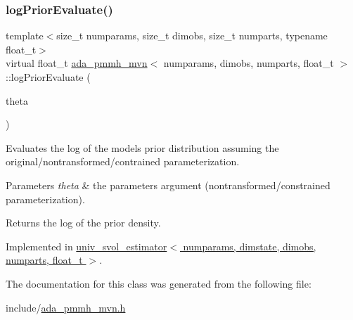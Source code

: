 \mbox{\label{classada__pmmh__mvn_af946eae70a63045515ed7830c35106dc}} 
\subsubsection{\texorpdfstring{log\+Prior\+Evaluate()}{logPriorEvaluate()}}
{\footnotesize\ttfamily template$<$size\+\_\+t numparams, size\+\_\+t dimobs, size\+\_\+t numparts, typename float\+\_\+t$>$ \\
virtual float\+\_\+t \hyperlink{classada__pmmh__mvn}{ada\+\_\+pmmh\+\_\+mvn}$<$ numparams, dimobs, numparts, float\+\_\+t $>$\+::log\+Prior\+Evaluate (\begin{DoxyParamCaption}\item[{const \hyperlink{classparamPack}{param\+Pack}$<$ float\+\_\+t $>$ \&}]{theta }\end{DoxyParamCaption})\hspace{0.3cm}{\ttfamily [pure virtual]}}



Evaluates the log of the model\textquotesingle{}s prior distribution assuming the original/nontransformed/contrained parameterization. 


\begin{DoxyParams}{Parameters}
{\em theta} & the parameters argument (nontransformed/constrained parameterization). \\
\hline
\end{DoxyParams}
\begin{DoxyReturn}{Returns}
the log of the prior density. 
\end{DoxyReturn}


Implemented in \hyperlink{classuniv__svol__estimator_a2e0e55bf061ca8f59fa5d42ae6495fdd}{univ\+\_\+svol\+\_\+estimator$<$ numparams, dimstate, dimobs, numparts, float\+\_\+t $>$}.



The documentation for this class was generated from the following file\+:\begin{DoxyCompactItemize}
\item 
include/\hyperlink{ada__pmmh__mvn_8h}{ada\+\_\+pmmh\+\_\+mvn.\+h}\end{DoxyCompactItemize}
